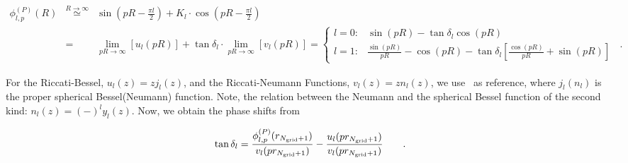 \documentclass[aps,onecolumn,preprintnumbers,amsmath,amssymb,nofootinbib,superscriptaddress,notitlepage]{revtex4-1}
\begin{document}
\begin{eqnarray}\label{eq.app.principal.value.wfkt}
\phi_{l,p}^{(P)}(R)
&
\stackrel{R\to\infty}{\simeq}
&
\sin\left(pR-\frac{\pi l}{2}\right)
+
K_l
\cdot
\cos\left(pR-\frac{\pi l}{2}\right)\\
&
=
&
\lim_{pR\to\infty}\left[u_l(pR)\right]
+
\tan\delta_l
\cdot
\lim_{pR\to\infty}\left[v_l(pR)\right]
=
\left\lbrace
\begin{array}{ll}
l=0:& \sin\left(pR\right)-\tan\delta_l\cos\left(pR\right)\\
l=1:& \frac{\sin\left(pR\right)}{pR}-\cos\left(pR\right)-\tan\delta_l\left[\frac{\cos\left(pR\right)}{pR}+\sin\left(pR\right)\right]
\end{array}
\right.
\;\;.
\quad
\end{eqnarray}

For the Riccati-Bessel, $u_l(z)=zj_l(z)$, and the Riccati-Neumann Functions, $v_l(z)=zn_l(z)$, we use
\cite{}~as reference, where $j_l(n_l)$ is the proper spherical Bessel(Neumann) function. Note, the relation
between the Neumann and the spherical Bessel function of the second kind: $n_l(z)=(-)^ly_l(z)$.
Now, we obtain the phase shifts from

\begin{equation}\label{eq.app.phases}
\tan\delta_l=\frac{\phi_{l,p}^{(P)}(r_{N_\text{\tiny grid}+1})}{v_l(pr_{N_\text{\tiny grid}+1})}-
\frac{u_l(pr_{N_\text{\tiny grid}+1})}{v_l(pr_{N_\text{\tiny grid}+1})}
\qquad.
\end{equation}
\end{document}
